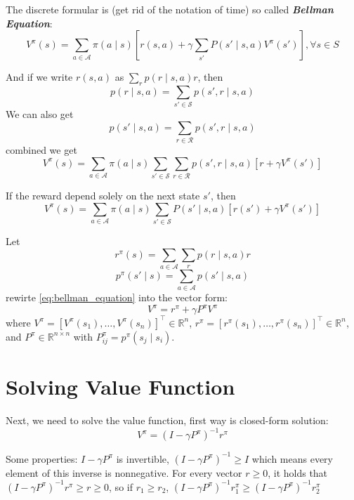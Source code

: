 \documentclass[10pt]{elegantbook}
\newcommand{\mydefination}[1]{\textbf{\textit{\textcolor{structurecolor}{#1}}}}
\begin{document}
The discrete formular is (get rid of the notation of time) so called \mydefination{Bellman Equation}:
\begin{equation} \label{eq:bellman_equation}
    V^{\pi}(s) = \sum_{a \in \mathcal A}\pi(a\mid s)\left[r(s,a) + \gamma \sum_{s'}P(s' \mid s, a)V^{\pi}(s')\right], \forall s \in S
\end{equation}

And if we write $r(s, a)$ as $\sum_r p(r \mid s, a) r$, then 
\[ p(r \mid s, a) = \sum_{s' \in \mathcal S}p(s', r \mid s, a) \]
We can also get
\[ p(s' \mid s, a) = \sum_{r \in \mathcal R} p(s', r \mid s, a) \]
combined we get
\begin{equation}
    V^{\pi}(s) = \sum_{a \in \mathcal A}\pi(a\mid s)\sum_{s' \in \mathcal S}\sum_{r \in \mathcal R}p(s', r \mid s, a)\left[r + \gamma V^{\pi}(s')\right]
\end{equation}

If the reward depend solely on the next state $s'$, then
\begin{equation}
    V^{\pi}(s) = \sum_{a \in \mathcal A}\pi(a\mid s)\sum_{s' \in \mathcal S}P(s' \mid s, a)\left[r(s') + \gamma V^{\pi}(s')\right]
\end{equation}

Let 
\[ r^{\pi}(s) = \sum_{a \in \mathcal A} \sum_r p(r \mid s, a) r \] 
\[ p^{\pi}(s' \mid s) = \sum_{a \in \mathcal A} p(s' \mid s, a) \] 
rewirte \ref{eq:bellman_equation} into the vector form:
\begin{equation}
    V^{\pi} = r^{\pi} + \gamma P^{\pi} V^{\pi}
\end{equation}
where $V^{\pi} = [V^{\pi}(s_1), \ldots, V^{\pi}(s_n)]^{\top} \in \mathbb R^n$, $r^{\pi} = [r^{\pi}(s_1), \ldots, r^{\pi}(s_n)]^{\top} \in \mathbb R^n$, and 
$P^{\pi} \in \mathbb R^{n \times n}$ with $P^{\pi}_{ij} = p^{\pi}(s_j \mid s_i)$.

\section{Solving Value Function}
Next, we need to solve the value function, first way is closed-form solution:
\[ V^{\pi} = \left ( I - \gamma P^{\pi} \right )^{-1} r^{\pi} \]

Some properties: $I - \gamma P^{\pi}$ is invertible, $\left ( I - \gamma P^{\pi} \right )^{-1} \geq I$ which means every element of this inverse is nonnegative.
For every vector $r \geq 0$, it holds that $\left ( I - \gamma P^{\pi} \right )^{-1} r^{\pi} \geq r \geq 0$, so if $r_1 \geq r_2$, $\left ( I - \gamma P^{\pi} \right )^{-1} r_1^{\pi} \geq
\left ( I - \gamma P^{\pi} \right )^{-1} r_2^{\pi}$
\end{document}
